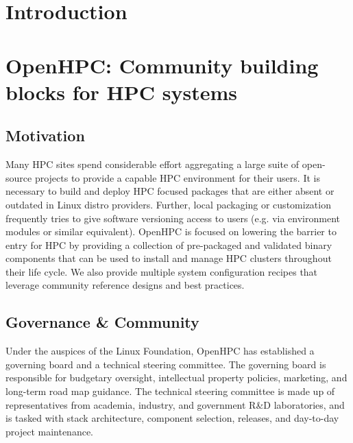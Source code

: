 \documentclass{sig-alternate-05-2015}
\begin{document}


%
%

%
%
\printccsdesc



\section{Introduction}

\section{OpenHPC: Community building blocks for HPC systems}

\subsection{Motivation}
Many HPC sites spend considerable effort aggregating a large suite of 
open-source projects to provide a capable HPC environment for their users.
It is necessary to build and deploy HPC focused packages that are either absent
or outdated in Linux distro providers. Further, local packaging or 
customization frequently tries to give software versioning access to users (e.g.
via environment modules or similar equivalent). OpenHPC is focused on 
lowering the barrier to entry for HPC by providing a collection of 
pre-packaged and validated binary components that can be used to install 
and manage HPC clusters throughout their life cycle. We also provide multiple 
system configuration recipes that leverage community reference designs and best 
practices. 

\subsection{Governance \& Community}
Under the auspices of the Linux Foundation, OpenHPC has established a governing
board and a technical steering committee. The governing board is responsible for
budgetary oversight, intellectual property policies, marketing, and long-term
road map guidance. The technical steering committee is made up of representatives
from academia, industry, and government R\&D laboratories, and is tasked with
stack architecture, component selection, releases, and day-to-day project
maintenance.
\end{document}
